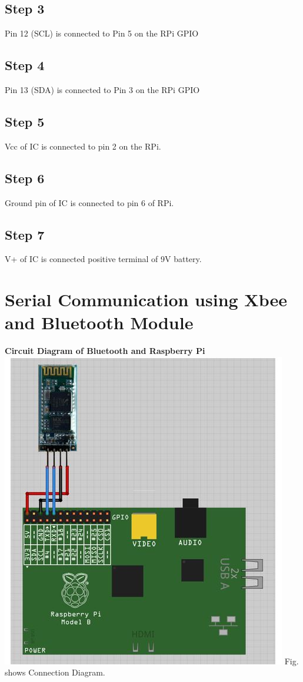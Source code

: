 \documentclass[a4paper,12pt,oneside]{book}
\begin{document}
\subsection*{Step 3}
Pin 12 (SCL) is connected to Pin 5 on the RPi GPIO
\subsection*{Step 4}
Pin 13 (SDA) is connected to Pin 3 on the RPi GPIO
\subsection*{Step 5}
Vcc of IC is connected to pin 2 on the RPi.
\subsection*{Step 6}
Ground pin of IC is connected to pin 6 of RPi.
\subsection*{Step 7}
V+ of IC is connected positive terminal of 9V battery.

\section{Serial Communication using Xbee and Bluetooth Module}
\textbf{Circuit Diagram of Bluetooth and Raspberry Pi}  \\
\centering
\includegraphics[scale = 0.6]{bluetooth}
\flushleft
Fig. shows Connection Diagram.
\end{document}
